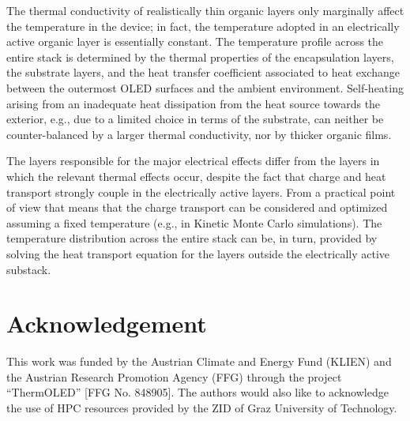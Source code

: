 \documentclass[%
9pt,
 aip,
rsi,%
 amsmath,amssymb,
preprint,%
]{revtex4-1}
\begin{document}
The thermal conductivity of realistically thin organic layers only marginally affect the temperature in the device; in fact, the temperature adopted in an electrically active organic layer is essentially constant. 
The temperature profile across the entire stack is determined by the thermal properties of the encapsulation layers, the substrate layers, and the heat transfer coefficient associated to heat exchange between the outermost OLED surfaces and the ambient environment.
Self-heating arising from an inadequate heat dissipation from the heat source towards the exterior, e.g., due to a limited choice in terms of the substrate, can neither be counter-balanced by a larger thermal conductivity, nor by thicker organic films. 

The layers responsible for the major electrical effects differ from the layers in which the relevant thermal effects occur, despite the fact that charge and heat transport strongly couple in the electrically active layers. 
From a practical point of view that means that the charge transport can be considered and optimized assuming a fixed temperature (e.g., in Kinetic Monte Carlo simulations). The temperature distribution across the entire stack can be, in turn, provided by solving the heat transport equation for the layers outside the electrically active substack.


\section{Acknowledgement}
This work was funded by the Austrian Climate and Energy Fund (KLIEN) and the Austrian Research Promotion Agency (FFG) through the project “ThermOLED” [FFG No. 848905]. The authors would also like to acknowledge the use of HPC resources provided by the ZID of Graz University of Technology.
\end{document}
